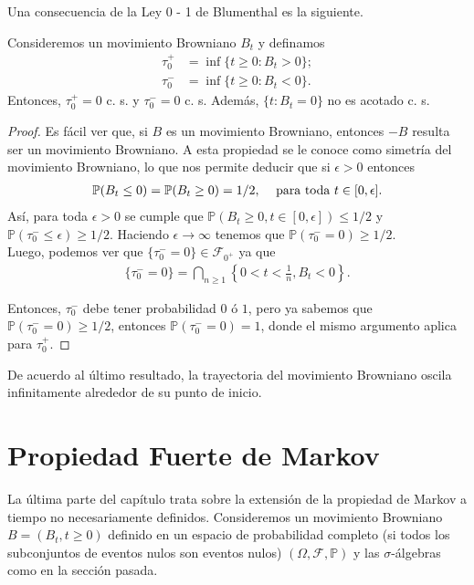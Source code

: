 Una consecuencia de la Ley 0 - 1 de Blumenthal es la siguiente. 

\begin{proposition}
Consideremos un movimiento Browniano $B_t$ y definamos
	\begin{align*}
	\tau_0^{+} & = \inf \{ t \geq 0 : B_t > 0 \}; \\
	\tau_0^{-} & = \inf \{ t \geq 0 : B_t < 0 \}.
	\end{align*}
Entonces, $\tau_0^{+} = 0$ c. s. y $\tau_0^{-} = 0$ c. s. Además, $\{t : B_t = 0\}$ no es acotado c. s.
\end{proposition}
\begin{proof}
Es fácil ver que, si $B$ es un movimiento Browniano, entonces $-B$ resulta ser un movimiento Browniano. A esta propiedad se le conoce como simetría del movimiento Browniano, lo que nos permite deducir que si $\epsilon > 0$ entonces
	\begin{align*}
	\mathbb{P} (B_t \leq 0) = \mathbb{P} (B_t \geq 0) = 1/2, \hspace{0.3cm} \text{ para toda } t \in [0, \epsilon].
	\end{align*}
Así, para toda $\epsilon > 0$ se cumple que $\mathbb{P} (B_t \geq 0, t \in [0, \epsilon]) \leq 1/2$ y $\mathbb{P}(\tau_0^{-} \leq \epsilon) \geq 1/2$. Haciendo $\epsilon \rightarrow \infty$ tenemos que $\mathbb{P}(\tau_0^{-} = 0) \geq 1/2$. \\

Luego, podemos ver que $\{\tau_0^{-} = 0\} \in \mathcal{F}_{0^{+}}$ ya que 
	\begin{align*}
	\{\tau_0^{-} = 0\} = \bigcap_{n \geq 1} \left\{ 0 < t < \frac{1}{n}, B_t < 0 \right\}.
	\end{align*}

Entonces, $\tau_0^{-}$ debe tener probabilidad $0$ ó $1$, pero ya sabemos que $\mathbb{P}(\tau_0^{-} = 0) \geq 1/2$, entonces $\mathbb{P}(\tau_0^{-} = 0) = 1$, donde el mismo argumento aplica para $\tau_0^{+}$. 
\end{proof}

De acuerdo al último resultado, la trayectoria del movimiento Browniano oscila infinitamente alrededor de su punto de inicio.

\section{Propiedad Fuerte de Markov}
La última parte del capítulo trata sobre la extensión de la propiedad de Markov a tiempo no necesariamente definidos. Consideremos un movimiento Browniano $B = (B_t, t \geq 0)$ definido en un espacio de probabilidad completo (si todos los subconjuntos de eventos nulos son eventos nulos) $(\Omega, \mathcal{F}, \mathbb{P})$ y las $\sigma$-álgebras como en la sección pasada.

